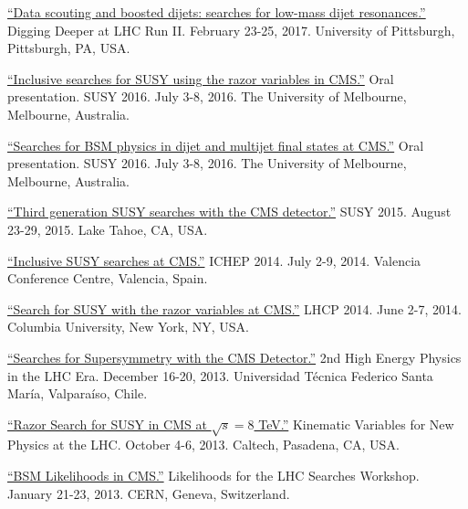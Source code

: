 \documentclass[12pt]{res}
\begin{document}
\begin{resume}
\href{https://indico.cern.ch/event/592671/contributions/2401900/}{``Data
    scouting and boosted dijets: searches for low-mass dijet
    resonances.''} Digging Deeper at LHC Run II. February
  23-25, 2017. University of Pittsburgh, Pittsburgh, PA, USA.

\href{https://indico.cern.ch/event/443176/contributions/2148316/}{``Inclusive
    searches for SUSY using the razor variables in CMS.''} Oral
  presentation. SUSY 2016. July 3-8, 2016. The University of Melbourne,
  Melbourne, Australia.

\href{https://indico.cern.ch/event/443176/contributions/2154549/}{``Searches
    for BSM physics in dijet and multijet final states at CMS.''} Oral
  presentation. SUSY 2016. July 3-8, 2016. The University of Melbourne,
  Melbourne, Australia.

\href{https://indico.cern.ch/event/331032/contributions/1720249/}{``Third
    generation SUSY searches with the CMS detector.''} SUSY 2015. August 23-29, 2015. Lake Tahoe,
  CA, USA.

\href{https://indico.ific.uv.es/indico/contributionDisplay.py?sessionId=24&contribId=289&confId=2025}{``Inclusive
    SUSY searches at CMS.''} ICHEP 2014. July 2-9, 2014. Valencia
  Conference Centre, Valencia, Spain.

\href{https://indico.cern.ch/event/279518/contributions/634785/}{``Search
    for SUSY with the razor variables at CMS.''} LHCP 2014. June
  2-7, 2014. Columbia University, New York, NY, USA.

\href{https://indico.cern.ch/event/252857/contributions/1579321/}{``Searches
    for Supersymmetry with the CMS Detector.''} 2nd
  High Energy Physics in the LHC Era. December 16-20,
  2013. Universidad T\'{e}cnica Federico Santa Mar\'{i}a,
  Valpara\'{i}so, Chile.

\href{https://indico.cern.ch/event/261650/contributions/586374/}{``Razor
    Search for SUSY in CMS at $\sqrt{s}=8$ TeV.''} Kinematic Variables for
  New Physics at the LHC. October 4-6, 2013. Caltech, Pasadena, CA, USA.

\href{https://indico.cern.ch/event/218693/contributions/1520333/}{``BSM Likelihoods in CMS.''} Likelihoods for
    the LHC Searches Workshop. January 21-23, 2013. CERN, Geneva,
    Switzerland.




\end{resume}
\end{document}
